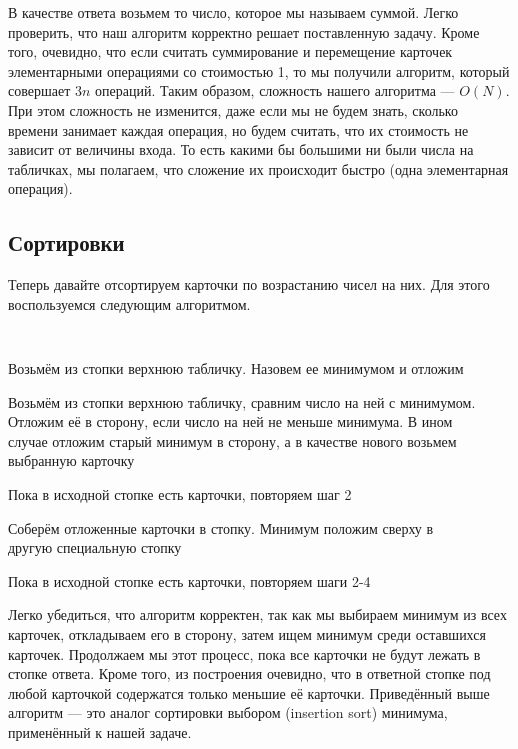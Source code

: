 В качестве ответа возьмем то число, которое мы называем суммой. Легко 
проверить, что наш алгоритм корректно решает поставленную задачу. Кроме того,
очевидно, что если считать суммирование и перемещение карточек элементарными 
операциями со стоимостью 1, то мы получили алгоритм, который совершает $3n$
операций. Таким образом, сложность нашего алгоритма --- $O(N)$. При этом 
сложность не изменится, даже если мы не будем знать, сколько времени занимает
каждая операция, но будем считать, что их стоимость не зависит от величины 
входа. То есть какими бы большими ни были числа на табличках, мы полагаем,
что сложение их происходит быстро (одна элементарная операция).

\subsection{Сортировки}

Теперь давайте отсортируем карточки по возрастанию чисел на них. Для этого 
воспользуемся следующим алгоритмом.

\begin{enumerate}
    {\tt
    \item Возьмём из стопки верхнюю табличку. Назовем ее минимумом и 
        отложим
    \item Возьмём из стопки верхнюю табличку, сравним число на ней с 
        минимумом. \\ Отложим её в сторону, если число на ней
        не меньше минимума. В ином \\ случае отложим старый минимум в 
        сторону, а в качестве нового возьмем \\ выбранную карточку
    \item Пока в исходной стопке есть карточки, повторяем шаг 2
    \item Соберём отложенные карточки в стопку. Минимум положим сверху 
        в \\ другую специальную стопку
    \item Пока в исходной стопке есть карточки, повторяем шаги 2-4
    }
\end{enumerate}

Легко убедиться, что алгоритм корректен, так как мы выбираем минимум из всех
карточек, откладываем его в сторону, затем ищем минимум среди оставшихся карточек.
Продолжаем мы этот процесс, пока все карточки не будут лежать в стопке ответа.
Кроме того, из построения очевидно, что в ответной стопке под любой карточкой 
содержатся только меньшие её карточки. Приведённый выше алгоритм --- это аналог
сортировки выбором (insertion sort) минимума, применённый к нашей задаче.

